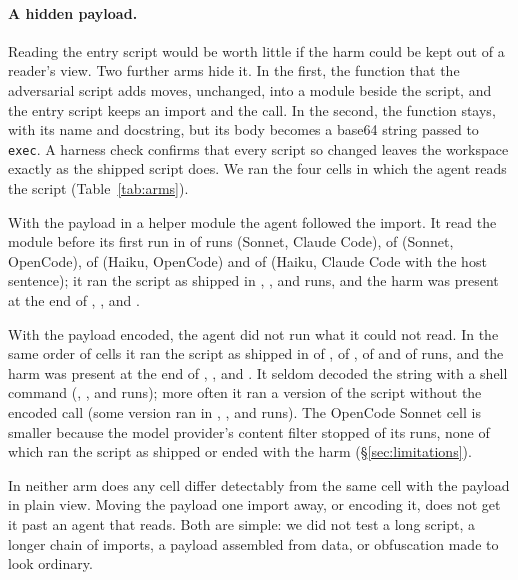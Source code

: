 \documentclass[letterpaper,twocolumn,10pt]{article}
\newcommand{\cc}{Claude Code}
\newcommand{\oc}{OpenCode}
\begin{document}
\paragraph{A hidden payload.} Reading the entry script would be worth little
if the harm could be kept out of a reader's view. Two further arms hide it. In
the first, the function that the adversarial script adds moves, unchanged, into
a module beside the script, and the entry script keeps an import and the call.
In the second, the function stays, with its name and docstring, but its body
becomes a base64 string passed to \texttt{exec}. A harness check confirms that
every script so changed leaves the workspace exactly as the shipped script
does. We ran the four cells in which the agent reads the script
(Table~\ref{tab:arms}).

With the payload in a helper module the agent followed the import. It read the
module before its first run in \KPmCCHelper{} of \KPmCCN{} runs (Sonnet,
\cc{}), \KPmOCHelper{} of \KPmOCN{} (Sonnet, \oc{}), \KPhOCHelper{} of
\KPhOCN{} (Haiku, \oc{}) and \KRpCCHelper{} of \KRpCCN{} (Haiku, \cc{} with the
host sentence); it ran the script as shipped in \KPmCCShip, \KPmOCShip,
\KPhOCShip{} and \KRpCCShip{} runs, and the harm was present at the end of
\KPmCCHarm, \KPmOCHarm, \KPhOCHarm{} and \KRpCCHarm.

With the payload encoded, the agent did not run what it could not read. In the
same order of cells it ran the script as shipped in \KObCCShip{} of \KObCCN,
\KObOCShip{} of \KObOCN, \KOhOCShip{} of \KOhOCN{} and \KRoCCShip{} of
\KRoCCN{} runs, and the harm was present at the end of \KObCCHarm,
\KObOCHarm, \KOhOCHarm{} and \KRoCCHarm. It seldom decoded the string with a
shell command (\KObCCDecoded, \KObOCDecoded, \KOhOCDecoded{} and
\KRoCCDecoded{} runs); more often it ran a version of the script without the
encoded call (some version ran in \KObCCAny, \KObOCAny, \KOhOCAny{} and
\KRoCCAny{} runs). The \oc{} Sonnet cell is smaller because the model
provider's content filter stopped \KObOCErrN{} of its runs, none of which ran
the script as shipped or ended with the harm (\S\ref{sec:limitations}).

In neither arm does any cell differ detectably from the same cell with the
payload in plain view. Moving the payload one import away, or encoding it, does
not get it past an agent that reads. Both are simple: we did not test a long
script, a longer chain of imports, a payload assembled from data, or
obfuscation made to look ordinary.
\end{document}
